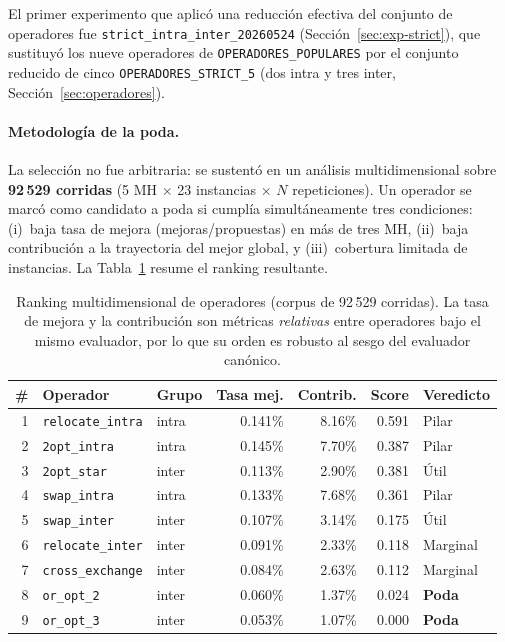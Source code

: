 \documentclass[11pt,a4paper]{article}
\theoremstyle{definition}
\theoremstyle{remark}
\begin{document}
El primer experimento que aplicó una reducción efectiva del conjunto de
operadores fue \texttt{strict\_intra\_inter\_20260524}
(Sección~\ref{sec:exp-strict}), que sustituyó los nueve operadores de
\texttt{OPERADORES\_POPULARES} por el conjunto reducido de cinco
\texttt{OPERADORES\_STRICT\_5} (dos intra y tres inter,
Sección~\ref{sec:operadores}).

\paragraph{Metodología de la poda.}
La selección no fue arbitraria: se sustentó en un análisis multidimensional
sobre \textbf{92\,529 corridas} (5 MH $\times$ 23 instancias $\times$ $N$
repeticiones). Un operador se marcó como candidato a poda si cumplía
simultáneamente tres condiciones: (i)~baja tasa de mejora
(mejoras/propuestas) en más de tres MH, (ii)~baja contribución a la
trayectoria del mejor global, y (iii)~cobertura limitada de instancias. La
Tabla~\ref{tab:poda-ranking} resume el ranking resultante.

\begin{table}[h]
\centering
\caption{Ranking multidimensional de operadores (corpus de 92\,529 corridas).
         La tasa de mejora y la contribución son métricas \emph{relativas}
         entre operadores bajo el mismo evaluador, por lo que su orden es
         robusto al sesgo del evaluador canónico.}
\label{tab:poda-ranking}
\small
\begin{tabular}{rllrrrl}
\toprule
\# & Operador & Grupo & Tasa mej. & Contrib. & Score & Veredicto \\
\midrule
1 & \texttt{relocate\_intra} & intra & 0.141\% & 8.16\% & 0.591 & Pilar \\
2 & \texttt{2opt\_intra}     & intra & 0.145\% & 7.70\% & 0.387 & Pilar \\
3 & \texttt{2opt\_star}      & inter & 0.113\% & 2.90\% & 0.381 & Útil \\
4 & \texttt{swap\_intra}     & intra & 0.133\% & 7.68\% & 0.361 & Pilar \\
5 & \texttt{swap\_inter}     & inter & 0.107\% & 3.14\% & 0.175 & Útil \\
6 & \texttt{relocate\_inter} & inter & 0.091\% & 2.33\% & 0.118 & Marginal \\
7 & \texttt{cross\_exchange} & inter & 0.084\% & 2.63\% & 0.112 & Marginal \\
8 & \texttt{or\_opt\_2}      & inter & 0.060\% & 1.37\% & 0.024 & \textbf{Poda} \\
9 & \texttt{or\_opt\_3}      & inter & 0.053\% & 1.07\% & 0.000 & \textbf{Poda} \\
\bottomrule
\end{tabular}
\end{table}
\end{document}
